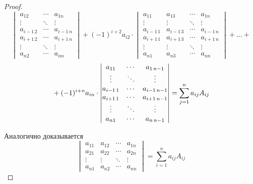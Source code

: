 \begin{proof}
\begin{equation*}
\begin{vmatrix}
a_{12} & \cdots & a_{1n} \\
\vdots & \ddots & \vdots \\
a_{i-1\, 2} & \cdots & a_{i-1\, n} \\
a_{i+1\, 2} & \cdots & a_{i+1\, n} \\
\vdots & \ddots & \vdots \\
a_{n2} & \cdots & a_{nn}
\end{vmatrix} +
(-1)^{i+2} a_{i2} \cdot
\begin{vmatrix}
a_{11} & a_{13} & \cdots & a_{1n} \\
\vdots & \vdots & \ddots & \vdots \\
a_{i-1\, 1} & a_{i-1\, 3} & \cdots & a_{i-1\, n} \\
a_{i+1\, 1} & a_{i+1\, 3} & \cdots & a_{i+1\, n} \\
\vdots & \vdots & \ddots & \vdots \\
a_{n1} & a_{n3} & \cdots & a_{nn}
\end{vmatrix} + \ldots +
\end{equation*}
\begin{equation*}
\vphantom1 + (-1)^{i+n} a_{in} \cdot
\begin{vmatrix}
a_{11} & \cdots & a_{1\, n-1} \\
\vdots & \ddots & \vdots \\
a_{i-1\, 1}  & \cdots & a_{i-1\, n-1} \\
a_{i+1\, 1} & \cdots & a_{i+1\, n-1} \\
\vdots & \ddots & \vdots \\
a_{n1} & \cdots & a_{n\, n-1}
\end{vmatrix} =
\sum_{j=1}^n a_{ij} A_{ij}
\end{equation*}

Аналогично доказывается
\begin{equation*}
\begin{vmatrix}
a_{11} & a_{12} & \cdots & a_{1n} \\
a_{21} & a_{22} & \cdots & a_{2n} \\
\vdots & \vdots & \ddots & \vdots \\
a_{n1} & a_{n2} & \cdots & a_{nn}
\end{vmatrix} =
\sum_{i=1}^n a_{ij} A_{ij}
\end{equation*}
\end{proof}


